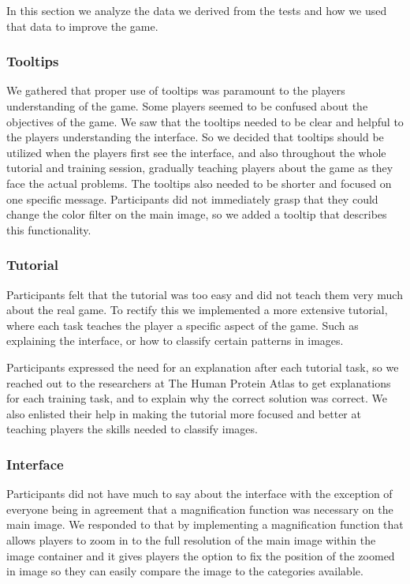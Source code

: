 In this section we analyze the data we derived from the tests and how we used that data to improve the game.

\subsubsection{Tooltips}
We gathered that proper use of tooltips was paramount to the players understanding of the game. Some players seemed to be confused about the objectives of the game. We saw that the tooltips needed to be clear and helpful to the players understanding the interface. So we decided that tooltips should be utilized when the players first see the interface, and also throughout the whole tutorial and training session, gradually teaching players about the game as they face the actual problems. The tooltips also needed to be shorter and focused on one specific message. Participants did not immediately grasp that they could change the color filter on the main image, so we added a tooltip that describes this functionality.

\subsubsection{Tutorial}
Participants felt that the tutorial was too easy and did not teach them very much about the real game. To rectify this we implemented a more extensive tutorial, where each task teaches the player a specific aspect of the game. Such as explaining the interface, or how to classify certain patterns in images. 

Participants expressed the need for an explanation after each tutorial task, so we reached out to the researchers at The Human Protein Atlas to get explanations for each training task, and to explain why the correct solution was correct. We also enlisted their help in making the tutorial more focused and better at teaching players the skills needed to classify images.

\subsubsection{Interface}
Participants did not have much to say about the interface with the exception of everyone being in agreement that a magnification function was necessary on the main image. We responded to that by implementing a magnification function that allows players to zoom in to the full resolution of the main image within the image container and it gives players the option to fix the position of the zoomed in image so they can easily compare the image to the categories available.

